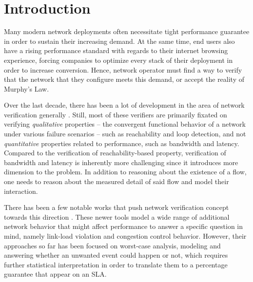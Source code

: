 \section{Introduction}

Many modern network deployments often necessitate tight performance guarantee in order to sustain 
their increasing demand.
At the same time, end users also have a rising performance standard with regards to their internet browsing 
experience, forcing companies to optimize every stack of their deployment in order to increase conversion.
Hence, network operator must find a way to verify that the network that they configure meets this demand, or 
accept the reality of Murphy's Law.

Over the last decade, there has been a lot of development in the area of network verification 
generally \cite{hsa}\cite{veriflow}.
Still, most of these verifiers are primarily fixated on verifying \textit{qualitative} properties 
-- the convergent functional behavior of a network under various failure scenarios -- 
such as reachability and loop detection, and not \textit{quantitative} properties 
related to performance, such as bandwidth and latency.
Compared to the verification of reachability-based property, verification of bandwidth and latency is 
inherently more challenging since it introduces more dimension to the problem.
In addition to reasoning about the existence of a flow, one needs to reason about the measured 
detail of said flow and model their interaction.

There has been a few notable works that push network verification concept towards this direction \cite{qarc}
\cite{ccac}.
These newer tools model a wide range of additional network behavior that might affect performance to answer a
specific question in mind, namely link-load violation and congestion control behavior.
However, their approaches so far has been focused on worst-case analysis, modeling and answering whether 
an unwanted event could happen or not, which requires further statistical interpretation in order to translate 
them to a percentage guarantee that appear on an SLA.

